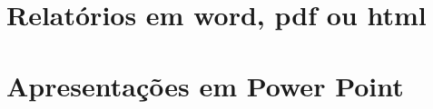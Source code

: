 \documentclass[
]{book}
\begin{document}
\hypertarget{relatuxf3rios-em-word-pdf-ou-html}{%
\section{Relatórios em word, pdf ou html}\label{relatuxf3rios-em-word-pdf-ou-html}}

\hypertarget{apresentauxe7uxf5es-em-power-point}{%
\section{Apresentações em Power Point}\label{apresentauxe7uxf5es-em-power-point}}

\backmatter
  
\end{document}
